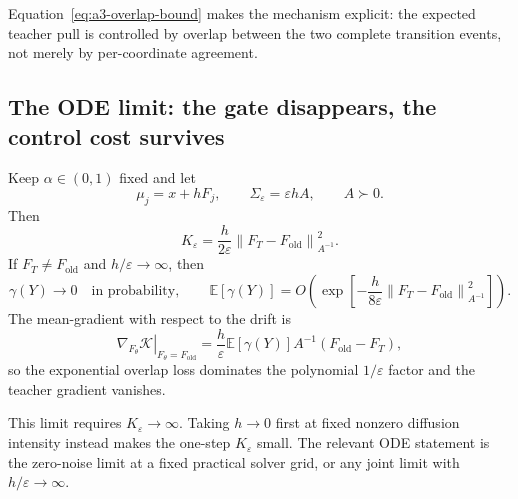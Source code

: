 \documentclass[11pt,a4paper]{article}
\newcommand{\E}{\mathbb{E}}
\newcommand{\norm}[1]{\left\lVert #1 \right\rVert}
\theoremstyle{plain}
\theoremstyle{definition}
\begin{document}
Equation~\eqref{eq:a3-overlap-bound} makes the mechanism explicit: the expected teacher pull is
controlled by overlap between the two complete transition events, not merely by per-coordinate
agreement.

\subsection{The ODE limit: the gate disappears, the control cost survives}

Keep $\alpha\in(0,1)$ fixed and let
\begin{equation}
\mu_j=x+hF_j,
\qquad
\Sigma_\varepsilon=\varepsilon hA,
\qquad
A\succ0 .
\label{eq:a3-euler-sde}
\end{equation}
Then
\begin{equation}
K_\varepsilon
=
\frac{h}{2\varepsilon}
\norm{F_T-F_{\mathrm{old}}}_{A^{-1}}^2.
\label{eq:a3-small-noise-K}
\end{equation}
If $F_T\neq F_{\mathrm{old}}$ and $h/\varepsilon\to\infty$, then
\begin{equation}
\gamma(Y)\to0
\quad\text{in probability},\qquad
\E[\gamma(Y)]
=
O\!\left(
  \exp\!\left[
    -\frac{h}{8\varepsilon}
    \norm{F_T-F_{\mathrm{old}}}_{A^{-1}}^2
  \right]
\right).
\label{eq:a3-small-noise-collapse}
\end{equation}
The mean-gradient with respect to the drift is
\begin{equation}
\left.
\nabla_{F_\theta}\mathcal K
\right|_{F_\theta=F_{\mathrm{old}}}
=
\frac{h}{\varepsilon}\E[\gamma(Y)]
A^{-1}(F_{\mathrm{old}}-F_T),
\label{eq:a3-drift-gradient}
\end{equation}
so the exponential overlap loss dominates the polynomial $1/\varepsilon$ factor and the teacher
gradient vanishes.

This limit requires $K_\varepsilon\to\infty$.  Taking $h\to0$ first at fixed nonzero diffusion
intensity instead makes the one-step $K_\varepsilon$ small.  The relevant ODE statement is the
zero-noise limit at a fixed practical solver grid, or any joint limit with $h/\varepsilon\to\infty$.
\end{document}

